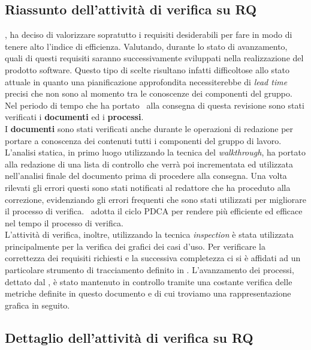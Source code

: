 \subsection{Riassunto dell'attività di verifica su RQ} %
\gruppo, ha deciso di valorizzare sopratutto i requisiti desiderabili per fare in modo di tenere alto l'indice di efficienza. Valutando, durante lo stato di avanzamento, quali di questi requisiti saranno successivamente sviluppati nella realizzazione del prodotto software. Questo tipo di scelte risultano infatti difficoltose allo stato attuale in quanto una pianificazione approfondita necessiterebbe di \textit{lead time}  precisi che non sono al momento tra le conoscenze dei componenti del gruppo.
Nel periodo di tempo che ha portato \gruppo ~alla consegna di questa revisione sono stati verificati i \textbf{documenti} ed i \textbf{processi}.\\
I \textbf{documenti} sono stati verificati anche durante le operazioni di redazione per portare a conoscenza dei contenuti tutti i componenti del gruppo di lavoro.
L'analisi statica, in primo luogo utilizzando la tecnica del \textit{walkthrough}, ha portato alla redazione  di una lista di controllo che verrà poi incrementata ed utilizzata nell'analisi finale del documento prima di procedere alla consegna. Una volta rilevati gli errori questi sono stati notificati al redattore che ha proceduto alla correzione, evidenziando gli errori frequenti che sono stati utilizzati per migliorare il processo di verifica. \gruppo ~adotta il ciclo PDCA per rendere più efficiente ed efficace nel tempo il processo di verifica.\\
L'attività di verifica, inoltre, utilizzando la tecnica \textit{inspection} è stata utilizzata principalmente per la verifica dei grafici dei casi d'uso. Per verificare la correttezza dei requisiti richiesti e la successiva completezza ci si è affidati ad un particolare strumento di tracciamento definito in \infoNDP.
L'avanzamento dei processi, dettato dal \infoPDP, è stato mantenuto in controllo tramite una costante verifica delle metriche definite in questo documento e di cui troviamo una rappresentazione grafica in seguito.
\subsection{Dettaglio dell'attività di verifica su RQ}
